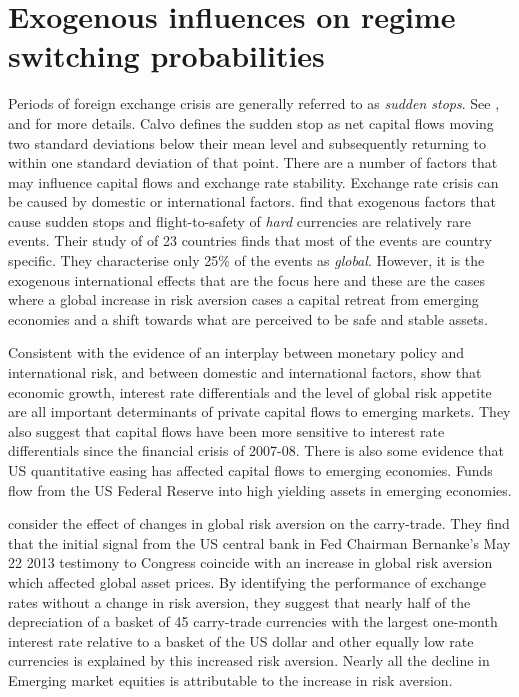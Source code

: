 \documentclass[12pt, a4paper, oneside]{article}\usepackage[]{graphicx}\usepackage[]{color}
\begin{document}
\section{Exogenous influences on regime switching probabilities}
Periods of foreign exchange crisis are generally referred to as \emph{sudden stops}.  See \citet{DornbuschSS}, \citet{CalvoSS} and \citet{KrugmanSS} for more details. Calvo  defines the sudden stop as net capital flows moving two standard deviations below their mean level and subsequently returning to within one standard deviation of that point. There are a number of factors that may influence capital flows and exchange rate stability. Exchange rate crisis can be caused by domestic or international factors.  \citet{FTS} find  that exogenous factors that cause sudden stops and flight-to-safety of \emph{hard} currencies  are relatively rare events. Their study of of 23 countries finds that most of the events are country specific. They characterise only 25\% of the events as \emph{global}. However, it is the exogenous international effects that are the focus here and these are the cases where a global increase in risk aversion cases a capital retreat from emerging economies and a shift towards what are perceived to be safe and stable assets. 

  Consistent with the evidence of an interplay between monetary policy and international risk, and between domestic and international factors, \citet{Ahmed2014} show that economic growth, interest rate differentials and the level of global risk appetite are all important determinants of private capital flows to emerging markets.  They also suggest that capital flows have been more sensitive to interest rate differentials since the financial crisis of 2007-08. There is also some evidence that US quantitative easing has affected capital flows to emerging economies.  Funds flow from the US Federal Reserve into high yielding assets in emerging economies. 

\citet{NYFedtaper} consider the effect of changes in global risk aversion on the carry-trade.  They find that the initial signal from the US central bank in Fed Chairman Bernanke's May 22 2013 testimony to Congress coincide with an increase in global risk aversion which affected global asset prices.  By identifying the performance of exchange rates without a change in risk aversion, they suggest that nearly half of the depreciation of a basket of 45 carry-trade currencies with the largest one-month interest rate relative to a basket of the US dollar and other equally low rate currencies is explained by this increased risk aversion. Nearly all the decline in Emerging market equities is attributable to the increase in risk aversion.
\end{document}
